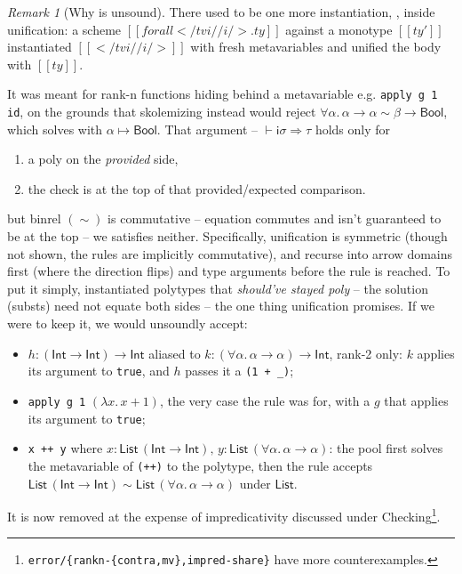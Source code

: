 \documentclass[a4paper, 11pt]{article}
\theoremstyle{remark}
\newtheorem*{remark}{Remark}
\begin{document}
\begin{remark}[Why  is unsound]
  There used to be one more instantiation, , inside unification: a scheme
  $[[forall </ tvi // i /> . ty]]$ against a monotype $[[ty']]$ instantiated $[[</ tvi // i />]]$
  with fresh metavariables and unified the body with $[[ty]]$.
  \begin{mathpar}
  \end{mathpar}
  It was meant for rank-n functions
  hiding behind a metavariable e.g. \texttt{apply g 1 id}, on the grounds that skolemizing instead
  would reject $\forall\alpha.\,\alpha\to\alpha \sim \beta\to\textsf{Bool}$, which solves with
  $\alpha\mapsto\textsf{Bool}$. That argument -- $\vdash\mathsf{i}\sigma\Rightarrow\tau$ holds only for
  \begin{enumerate}
    \item a poly on the \emph{provided} side,
    \item the check is at the top of that provided/expected comparison.
  \end{enumerate}
  but binrel $(\sim)$ is commutative -- equation commutes and 
  isn't guaranteed to be at the top -- we satisfies neither.
  Specifically, unification is symmetric (though not shown, the rules are implicitly commutative),
  and  recurse into arrow domains first (where the direction flips)
  and type arguments before the rule is reached. To put it simply,  instantiated polytypes that \textit{should've stayed poly}
  -- the solution (substs) need not equate both sides
  -- the one thing unification promises.
  If we were to keep it, we would unsoundly accept:
  \begin{itemize}
    \item $h : (\textsf{Int}\to\textsf{Int})\to\textsf{Int}$ aliased to
      $k : (\forall\alpha.\,\alpha\to\alpha)\to\textsf{Int}$, rank-2 only: $k$ applies its argument
      to \texttt{true}, and $h$ passes it a \texttt{(1 + \_)};
    \item \texttt{apply g 1} $(\lambda x.\,x+1)$, the very case the rule was for, with a $g$
      that applies its argument to \texttt{true};
    \item \texttt{x ++ y} where $x : \textsf{List}\,(\textsf{Int}\to\textsf{Int}),\, y : \textsf{List}\,(\forall\alpha.\,\alpha\to\alpha)$: the pool first solves the metavariable
      of \texttt{(++)} to the polytype, then the rule accepts
      $\textsf{List}\,(\textsf{Int}\to\textsf{Int}) \sim \textsf{List}\,(\forall\alpha.\,\alpha\to\alpha)$
      under $\textsf{List}$.
  \end{itemize}
  It is now removed at the expense of impredicativity discussed under Checking\footnote{
    \texttt{error/\{rankn-\{contra,mv\},impred-share\}} have more counterexamples.
  }.
\end{remark}
\end{document}
